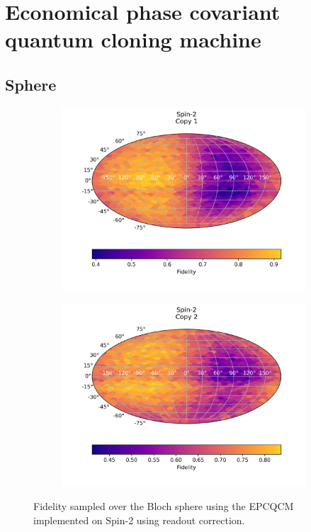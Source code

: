 \section{Economical phase covariant quantum cloning machine}
\subsection{Sphere}

\begin{figure}[H]
    \centering
    \begin{subfigure}{.5\textwidth}
      \centering
      \includegraphics[width=\textwidth]{Figures/Economical/Spin2/FullSphere/results_spin2_copy1.png}
      \label{fig:epc_uncorrected_spin_sphere_1}
    \end{subfigure}%
    \begin{subfigure}{.5\textwidth}
      \centering
      \includegraphics[width=\textwidth]{Figures/Economical/Spin2/FullSphere/results_spin2_copy2.png}
      \label{fig:epc_uncorrected_spin_sphere_2}
    \end{subfigure}
    \caption{Fidelity sampled over the Bloch sphere using the EPCQCM implemented on Spin-2 using readout correction.}
    \label{fig:epc_uncorrected_spin_sphere}
  \end{figure}
  
